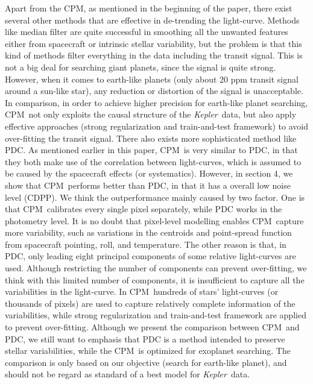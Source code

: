 \documentclass[12pt, preprint]{aastex}
\newcommand{\project}[1]{\textsl{#1}}
\newcommand{\Kepler}{\project{Kepler}}
\newcommand{\name}{CPM}
\begin{document}
Apart from the \name, as mentioned in the beginning of the paper, 
  there exist several other methods that are effective in de-trending the light-curve.
Methods like median filter are quite successful in smoothing all the unwanted features 
  either from spacecraft or intrinsic stellar variability, 
  but the problem is that this kind of methods filter everything in the data including the transit signal. 
This is not a big deal for searching giant planets, since the signal is quite strong. 
However, 
  when it comes to earth-like planets (only about 20 ppm transit signal around a sun-like star),
  any reduction or distortion of the signal is unacceptable. 
In comparison, in order to achieve higher precision for earth-like planet searching, 
  \name\  not only exploits the causal structure of the \Kepler\ data,
  but also apply effective approaches (strong regularization and train-and-test framework)
  to avoid over-fitting the transit signal.
There also exists more sophisticated method like PDC.
As mentioned earlier in this paper, 
  \name\ is very similar to PDC, 
  in that they both make use of the correlation between light-curves,
  which is assumed to be caused by the spacecraft effects (or systematics).
However, in section 4, we show that \name\ performs better than PDC, 
  in that it has a overall low noise level (CDPP).
We think the outperformance mainly caused by two factor.
One is that \name\ calibrates every single pixel separately, 
  while PDC works in the photometry level.
It is no doubt that pixel-level modelling enables \name\ capture more variability, such as 
variations in the centroids and point-spread function from spacecraft pointing, roll, and temperature.
The other reason is that,  
  in PDC,  only leading eight principal components of some relative light-curves are used.
Although restricting the number of components can prevent over-fitting, we think with this limited number of components, 
  it is insufficient to capture all the variabilities in the light-curve.
In \name\, hundreds of stars' light-curves (or thousands of pixels) are used 
  to capture relatively complete information of the variabilities, 
  while strong regularization and train-and-test framework are applied to prevent over-fitting.
Although we present the comparison between \name\ and PDC, 
  we still want to emphasis that PDC is a method intended to preserve stellar variabilities, 
  while the \name\ is optimized for exoplanet searching. 
The comparison is only based on our objective (search for earth-like planet), 
  and should not be regard as standard of a best model for \Kepler\ data.
  
\end{document}
